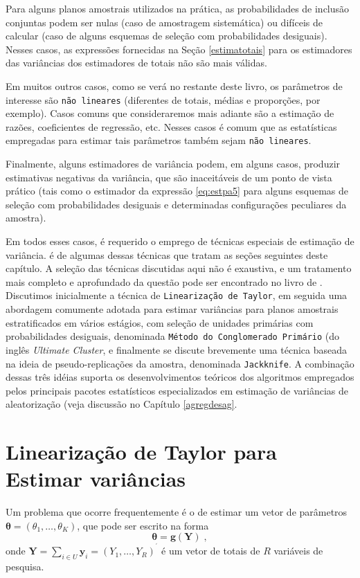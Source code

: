 \documentclass[]{book}
\theoremstyle{definition}
\theoremstyle{definition}
\theoremstyle{definition}
\theoremstyle{remark}
\begin{document}
Para alguns planos amostrais utilizados na prática, as probabilidades de
inclusão conjuntas podem ser nulas (caso de amostragem sistemática) ou
difíceis de calcular (caso de alguns esquemas de seleção com
probabilidades desiguais). Nesses casos, as expressões fornecidas na
Seção \ref{estimatotais} para os estimadores das variâncias dos
estimadores de totais não são mais válidas.

Em muitos outros casos, como se verá no restante deste livro, os
parâmetros de interesse são \texttt{não\ lineares} (diferentes de
totais, médias e proporções, por exemplo). Casos comuns que
consideraremos mais adiante são a estimação de razões, coeficientes de
regressão, etc. Nesses casos é comum que as estatísticas empregadas para
estimar tais parâmetros também sejam \texttt{não\ lineares}.

Finalmente, alguns estimadores de variância podem, em alguns casos,
produzir estimativas negativas da variância, que são inaceitáveis de um
ponto de vista prático (tais como o estimador da expressão
\eqref{eq:estpa5} para alguns esquemas de seleção com probabilidades
desiguais e determinadas configurações peculiares da amostra).

Em todos esses casos, é requerido o emprego de técnicas especiais de
estimação de variância. é de algumas dessas técnicas que tratam as
seções seguintes deste capítulo. A seleção das técnicas discutidas aqui
não é exaustiva, e um tratamento mais completo e aprofundado da questão
pode ser encontrado no livro de \citep{W85}. Discutimos inicialmente a
técnica de \texttt{Linearização\ de\ Taylor}, em seguida uma abordagem
comumente adotada para estimar variâncias para planos amostrais
estratificados em vários estágios, com seleção de unidades primárias com
probabilidades desiguais, denominada
\texttt{Método\ do\ Conglomerado\ Primário} (do inglês \emph{Ultimate
Cluster}, e finalmente se discute brevemente uma técnica baseada na
ideia de pseudo-replicações da amostra, denominada \texttt{Jackknife}. A
combinação dessas três idéias suporta os desenvolvimentos teóricos dos
algoritmos empregados pelos principais pacotes estatísticos
especializados em estimação de variâncias de aleatorização (veja
discussão no Capítulo \ref{agregdesag}.

\section{Linearização de Taylor para Estimar variâncias}\label{taylor}

Um problema que ocorre frequentemente é o de estimar um vetor de
parâmetros
\(\mathbf{\theta =}\left( \theta _{1},\ldots ,\theta_{K}\right)\), que
pode ser escrito na forma \[
\mathbf{\theta }=\mathbf{g}(\mathbf{Y})\;, 
\] onde
\(\mathbf{Y}=\sum_{i\in U}\mathbf{y}_{i}=(Y_{1},\ldots ,Y_{R})^{^{\prime}}\)
é um vetor de totais de \(R\) variáveis de pesquisa.
\end{document}
